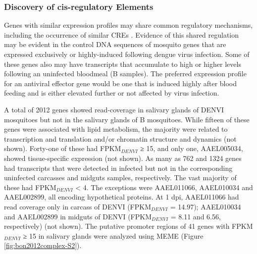 \subsubsection{Discovery of cis-regulatory Elements}

Genes with similar expression profiles may share common regulatory mechanisms, including the occurrence of similar \glspl{CRE} \cite{Sieglaff2009}.
Evidence of this shared regulation may be evident in the control DNA sequences of mosquito genes that are expressed exclusively or highly-induced following dengue virus infection.
Some of these genes also may have transcripts that accumulate to high or higher levels following an uninfected bloodmeal (B samples).
The preferred expression profile for an antiviral effector gene would be one that is induced highly after blood feeding and is either elevated further or not affected by virus infection.

A total of 2012 genes showed read-coverage in salivary glands of \gls{DENVI} mosquitoes but not in the salivary glands of B mosquitoes.
While fifteen of these genes were associated with lipid metabolism, the majority were related to transcription and translation and/or chromatin structure and dynamics (not shown).
Forty-one of these had FPKM$_{DENVI}$ ≥ 15, and only one, AAEL005034, showed tissue-specific expression (not shown).
As many as 762 and 1324 genes had transcripts that were detected in infected but not in the corresponding uninfected carcasses and midguts samples, respectively.
The vast majority of these had FPKM$_{DENVI}$ < 4.
The exceptions were AAEL011066, AAEL010034 and AAEL002899, all encoding hypothetical proteins.
At 1 \gls{dpi}, AAEL011066 had read coverage only in carcass of \gls{DENVI} (FPKM$_{DENVI}$ = 14.97); AAEL010034 and AAEL002899 in midguts of \gls{DENVI} (FPKM$_{DENVI}$ = 8.11 and 6.56, respectively) (not shown).
The putative promoter regions of 41 genes with FPKM$_{DENVI}$ ≥ 15 in salivary glands were analyzed using MEME \cite{Bailey2006} (Figure \ref{fig:bon2012complex-S2}).

